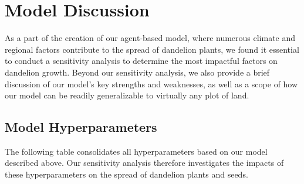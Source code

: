 \section{Model Discussion}

As a part of the creation of our agent-based model, where numerous climate and regional factors contribute to the spread of dandelion plants, we found it essential to conduct a sensitivity analysis to determine the most impactful factors on dandelion growth. Beyond our sensitivity analysis, we also provide a brief discussion of our model's key strengths and weaknesses, as well as a scope of how our model can be readily generalizable to virtually any plot of land.

\subsection{Model Hyperparameters}

The following table consolidates all hyperparameters based on our model described above. Our sensitivity analysis therefore investigates the impacts of these hyperparameters on the spread of dandelion plants and seeds.

